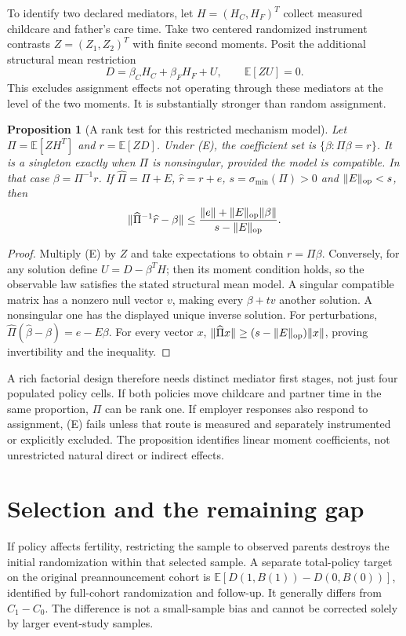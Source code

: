 \documentclass[11pt]{article}
\newtheorem{proposition}[theorem]{Proposition}
\theoremstyle{remark}\newtheorem{remark}[theorem]{Remark}
\newcommand{\E}{\mathbb E}
\begin{document}
To identify two declared mediators, let $H=(H_C,H_F)^T$ collect measured childcare and father's care time. Take two centered randomized instrument contrasts $Z=(Z_1,Z_2)^T$ with finite second moments. Posit the additional structural mean restriction
\[
 D=\beta_C H_C+\beta_F H_F+U,
                       \qquad \E[Z U]=0.\tag{E}
\]
This excludes assignment effects not operating through these mediators at the level of the two moments. It is substantially stronger than random assignment.

\begin{proposition}[A rank test for this restricted mechanism model]\label{rank}
Let $\Pi=\E[ZH^T]$ and $r=\E[ZD]$. Under (E), the coefficient set is $\{\beta:\Pi\beta=r\}$. It is a singleton exactly when $\Pi$ is nonsingular, provided the model is compatible. In that case $\beta=\Pi^{-1}r$. If $\widehat\Pi=\Pi+E$, $\widehat r=r+e$, $s=\sigma_{\min}(\Pi)>0$ and $\|E\|_{\rm op}<s$, then
\[
 \|\widehat\Pi^{-1}\widehat r-\beta\|
       \leq\frac{\|e\|+\|E\|_{\rm op}\|\beta\|}
                     {s-\|E\|_{\rm op}}.
\]
\end{proposition}
\begin{proof}
Multiply (E) by $Z$ and take expectations to obtain $r=\Pi\beta$. Conversely, for any solution define $U=D-\beta^TH$; then its moment condition holds, so the observable law satisfies the stated structural mean model. A singular compatible matrix has a nonzero null vector $v$, making every $\beta+tv$ another solution. A nonsingular one has the displayed unique inverse solution. For perturbations,
$\widehat\Pi(\widehat\beta-\beta)=e-E\beta$.
For every vector $x$, $\|\widehat\Pi x\|\geq(s-\|E\|_{\rm op})\|x\|$, proving invertibility and the inequality.
\end{proof}

A rich factorial design therefore needs distinct mediator first stages, not just four populated policy cells. If both policies move childcare and partner time in the same proportion, $\Pi$ can be rank one. If employer responses also respond to assignment, (E) fails unless that route is measured and separately instrumented or explicitly excluded. The proposition identifies linear moment coefficients, not unrestricted natural direct or indirect effects.

\section{Selection and the remaining gap}
If policy affects fertility, restricting the sample to observed parents destroys the initial randomization within that selected sample. A separate total-policy target on the original preannouncement cohort is
$\E[D(1,B(1))-D(0,B(0))]$, identified by full-cohort randomization and follow-up. It generally differs from $C_1-C_0$. The difference is not a small-sample bias and cannot be corrected solely by larger event-study samples.
\end{document}
